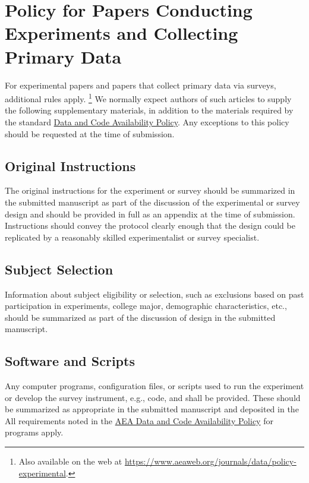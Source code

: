 \section{Policy for Papers Conducting Experiments and Collecting Primary  Data}\label{policy-for-papers-conducting-experiments-and-collecting-primary-data}

For experimental papers and papers that collect primary data via
surveys, additional rules apply.%
\footnote{Also available on the web at 
	\url{https://www.aeaweb.org/journals/data/policy-experimental}.}
We normally expect authors of such
articles to supply the following supplementary materials, in addition to
the materials required by the standard \hyperref[data-and-code-availability-policy]{Data and Code
Availability Policy}. Any exceptions to this policy should be requested
at the time of submission.

\subsection{Original Instructions}\label{original-instructions}

The original instructions for the experiment or survey should be
summarized in the submitted manuscript as part of the discussion of the
experimental or survey design and should be provided in full as an
appendix at the time of submission. Instructions should convey the
protocol clearly enough that the design could be replicated by a
reasonably skilled experimentalist or survey specialist.

\subsection{Subject Selection}\label{subject-selection}

Information about subject eligibility or selection, such as exclusions
based on past participation in experiments, college major, demographic
characteristics, etc., should be summarized as part of the discussion of
design in the submitted manuscript.

\subsection{Software and Scripts}\label{software-and-scripts}

Any computer programs, configuration files, or scripts used to run the
experiment or develop the survey instrument, e.g.,
 code,
and  shall be provided.
These should be summarized as appropriate in the submitted manuscript
and deposited in the  All requirements noted in the
\hyperref[data-and-code-availability-policy]{AEA Data and Code Availability Policy} for programs
apply.

